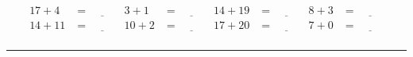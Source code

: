 \documentclass{article}
\begin{document}
\begin{sloppy}
\begin{align*}
    {17} + {4} &= \underline{\hspace{1cm}} & {3} + {1} &= \underline{\hspace{1cm}} & {14} + {19} &= \underline{\hspace{1cm}} & {8} + {3} &= \underline{\hspace{1cm}} \\
    {14} + {11} &= \underline{\hspace{1cm}} & {10} + {2} &= \underline{\hspace{1cm}} & {17} + {20} &= \underline{\hspace{1cm}} & {7} + {0} &= \underline{\hspace{1cm}} \\
\end{align*}
\hrule
\end{sloppy}
\end{document}
